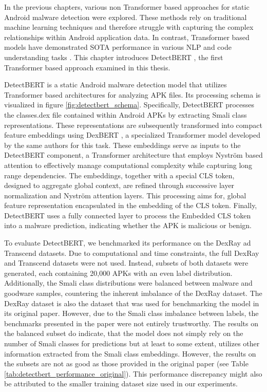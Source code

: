 In the previous chapters, various non Transformer based approaches for 
static Android malware detection were explored. 
These methods rely on traditional machine learning techniques and therefore  
struggle with capturing the complex relationships within Android application data. 
In contrast, Transformer based models have demonstrated SOTA 
performance in various NLP and code understanding tasks \cite{transformer_sota}. 
This chapter introduces DetectBERT \cite{detectbert}, the first Transformer based approach examined 
in this thesis.

DetectBERT is a static Android malware detection model that utilizes Transformer based architectures for analyzing APK files.
Its processing schema is visualized in figure \ref{fig:detectbert_schema}.
Specifically, DetectBERT processes the classes.dex file contained within Android APKs by extracting Smali class representations. 
These representations are subsequently transformed into compact feature embeddings using DexBERT \cite{dexbert}, 
a specialized Transformer model developed by the same authors for this task.
These embeddings serve as inputs to the DetectBERT component, 
a Transformer architecture that employs Nyström based attention \cite{nystromformer} 
to effectively manage computational complexity while capturing long range dependencies. 
The embeddings, together with a special CLS token, designed to aggregate global context, 
are refined through successive layer normalization and Nyström attention layers. 
This processing aims for, global feature representation encapsulated in the embedding of the CLS token.
Finally, DetectBERT uses a fully connected  layer to process the Embedded CLS token into a  malware prediction, 
indicating whether the APK is malicious or benign.

To evaluate DetectBERT, we benchmarked its performance on the DexRay ad Transcend datasets. 
Due to computational and time constraints, the full DexRay and Transcend datasets were not used. 
Instead, subsets of both datasets were generated, each containing 20,000 APKs with an even label distribution. 
Additionally, the Smali class distributions were balanced between malware and 
goodware samples, countering the inherent imbalance of the DexRay dataset. 
The DexRay dataset is also the dataset that was used for benchmarking the model 
in its original paper. However, due to the Smali class imbalance between labels, 
the benchmarks presented in the paper were not entirely trustworthy. 
The results on the balanced subset do indicate, that the model does not simply rely 
on the number of Smali classes for predictions but at least to some extent, 
utilizes other information extracted from the Smali class embeddings. 
However, the results on the subsets are not as good as those provided in the 
original paper (see Table \ref{tab:detectbert_performance_original}). 
This performance discrepancy might also be attributed 
to the smaller training dataset size used in our experiments.

